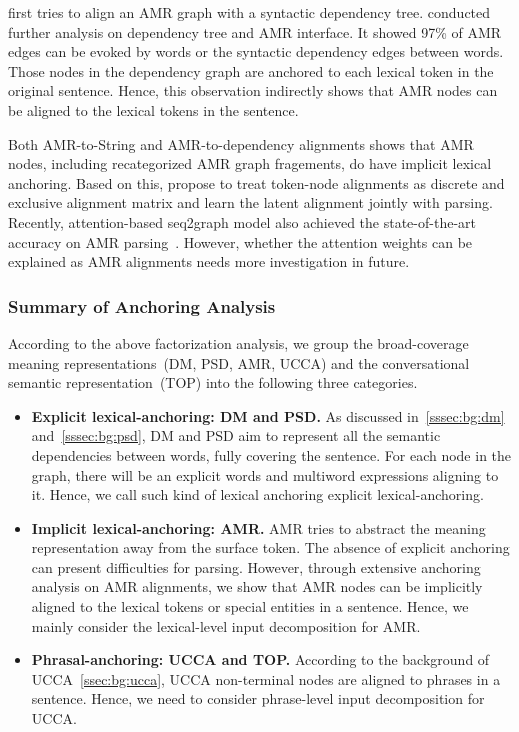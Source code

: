  \citet{chen2017unsupervised}
first tries to align an AMR graph with a syntactic dependency tree.
\citet{szubert2018structured} conducted further analysis on dependency
tree and AMR interface. It showed 97\% of AMR edges can be evoked by
words or the syntactic dependency edges between words.  Those nodes in
the dependency graph are anchored to each lexical token in the
original sentence. Hence, this observation indirectly shows that AMR
nodes can be aligned to the lexical tokens in the sentence.

Both AMR-to-String and AMR-to-dependency alignments shows that AMR
nodes, including recategorized AMR graph fragements, do have implicit
lexical anchoring. Based on this, \citet{lyu2018amr} propose to treat
token-node alignments as discrete and exclusive alignment matrix and
learn the latent alignment jointly with parsing. Recently,
attention-based seq2graph model also achieved the state-of-the-art
accuracy on AMR parsing~\citep{zhang-etal-2018-stog}.  However, whether
the attention weights can be explained as AMR alignments needs more
investigation in future.

\subsubsection{Summary of Anchoring Analysis}
\label{sssec:lex-phr:sum-anchoring}
According to the above factorization analysis, we group the
broad-coverage meaning representations~(DM, PSD, AMR, UCCA) and the
conversational semantic representation~(TOP) into the following three
categories.

\begin{itemize}
\item \textbf{Explicit lexical-anchoring: DM and PSD.} As discussed
  in~\autoref{sssec:bg:dm} and~\autoref{sssec:bg:psd}, DM and PSD aim
  to represent all the semantic dependencies between words, fully
  covering the sentence. For each node in the graph, there will be an
  explicit words and multiword expressions aligning to it. Hence, we
  call such kind of lexical anchoring explicit lexical-anchoring.

\item \textbf{Implicit lexical-anchoring: AMR.} AMR tries to abstract
  the meaning representation away from the surface token. The absence
  of explicit anchoring can present difficulties for parsing. However,
  through extensive anchoring analysis on AMR alignments, we show that
  AMR nodes can be implicitly aligned to the lexical tokens or special
  entities in a sentence. Hence, we mainly consider the lexical-level
  input decomposition for AMR.

\item \textbf{Phrasal-anchoring: UCCA and TOP.} According to the
background of UCCA~\autoref{ssec:bg:ucca}, UCCA non-terminal nodes are
aligned to phrases in a sentence. Hence, we need to consider
phrase-level input decomposition for UCCA.
\end{itemize}

